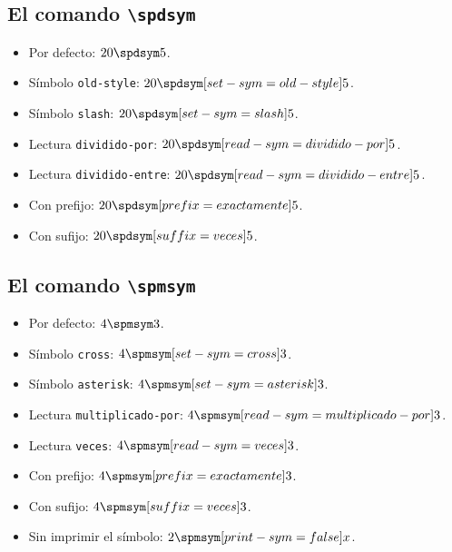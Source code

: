 \documentclass{article}
\begin{document}
\subsection*{El comando \texttt{\textbackslash spdsym}}

\begin{itemize}
  \item Por defecto: $20 \spdsym 5$.
  \item Símbolo \texttt{old-style}: $20 \spdsym[set-sym=old-style] 5$.
  \item Símbolo \texttt{slash}: $20 \spdsym[set-sym=slash] 5$.
  \item Lectura \texttt{dividido-por}: $20 \spdsym[read-sym=dividido-por] 5$.
  \item Lectura \texttt{dividido-entre}: $20 \spdsym[read-sym=dividido-entre] 5$.
  \item Con prefijo: $20 \spdsym[prefix={exactamente}] 5$.
  \item Con sufijo: $20 \spdsym[suffix={veces}] 5$.
\end{itemize}

\subsection*{El comando \texttt{\textbackslash spmsym}}

\begin{itemize}
  \item Por defecto: $4 \spmsym 3$.
  \item Símbolo \texttt{cross}: $4 \spmsym[set-sym=cross] 3$.
  \item Símbolo \texttt{asterisk}: $4 \spmsym[set-sym=asterisk] 3$.
  \item Lectura \texttt{multiplicado-por}: $4 \spmsym[read-sym=multiplicado-por] 3$.
  \item Lectura \texttt{veces}: $4 \spmsym[read-sym=veces] 3$.
  \item Con prefijo: $4 \spmsym[prefix={exactamente}] 3$.
  \item Con sufijo: $4 \spmsym[suffix={veces}] 3$.
  \item Sin imprimir el símbolo: $2 \spmsym[print-sym=false] x$.
\end{itemize}
\end{document}
